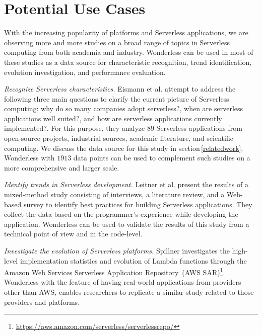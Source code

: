 \section{Potential Use Cases}
\label{usecase}

With the increasing popularity of \faas platforms and Serverless applications, 
we are observing more and more studies on a broad range of topics in 
Serverless computing from both academia and industry. Wonderless can 
be used in most of these studies as a data source for characteristic recognition, 
trend identification, evolution investigation, and performance evaluation.

\vspace{2mm}
\emph{Recognize Serverless characteristics.}
Eismann et al.\cite{eismann2020serverless} attempt to address the following 
three main questions to clarify the current picture of Serverless computing: 
why do so many companies adopt serverless?, when are serverless applications 
well suited?, and how are serverless applications currently implemented?. For this 
purpose, they analyze 89 Serverless applications from open-source projects, 
industrial sources, academic literature, and scientific computing. We discuss 
the data source for this study in section\,\ref{relatedwork}. Wonderless with 
$1913$ data points can be used to complement such studies on a more 
comprehensive and larger scale.

\vspace{2mm}
\emph{Identify trends in Serverless development.}
Leitner et al.\cite{leitner2019mixed} present the results of a mixed-method 
study consisting of interviews, a literature review, and a Web-based survey 
to identify best practices for building Serverless applications. 
They collect the data based on the programmer's experience while 
developing the application. Wonderless can be used to validate the 
results of this study from a technical point of view and in the code-level.

\vspace{2mm}
\emph{Investigate the evolution of Serverless platforms.}
Spillner\cite{spillner2019quantitative} investigates the high-level 
implementation statistics and evolution of Lambda functions through the 
Amazon Web Services Serverless Application Repository\,
(AWS SAR)\footnote{\url{https://aws.amazon.com/serverless/serverlessrepo/}}. 
Wonderless with the feature of having real-world applications from
providers other than AWS, enables researchers to replicate a similar 
study related to those providers and platforms.

